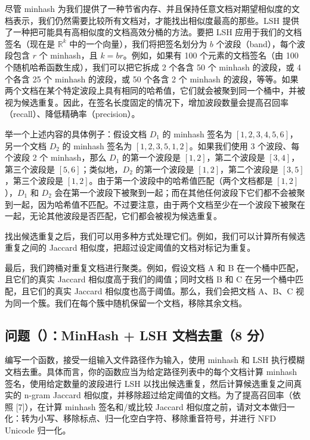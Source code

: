 尽管 minhash 为我们提供了一种节省内存、并且保持任意文档对期望相似度的文档表示，我们仍然需要比较所有文档对，才能找出相似度最高的那些。LSH 提供了一种把可能具有高相似度的文档高效分桶的方法。要把 LSH 应用于我们的文档签名（现在是 $\mathbb{R}^k$ 中的一个向量），我们将把签名划分为 $b$ 个波段（band），每个波段包含 $r$ 个 minhash，且 $k = br$。例如，如果有 100 个元素的文档签名（由 100 个随机哈希函数生成），我们可以把它拆成 2 个各含 50 个 minhash 的波段，或 4 个各含 25 个 minhash 的波段，或 50 个各含 2 个 minhash 的波段，等等。如果两个文档在某个特定波段上具有相同的哈希值，它们就会被聚到同一个桶中，并被视为候选重复。因此，在签名长度固定的情况下，增加波段数量会提高召回率（recall）、降低精确率（precision）。

举一个上述内容的具体例子：假设文档 $D_1$ 的 minhash 签名为 $[1, 2, 3, 4, 5, 6]$，另一个文档 $D_2$ 的 minhash 签名为 $[1, 2, 3, 5, 1, 2]$。如果我们使用 3 个波段、每个波段 2 个 minhash，那么 $D_1$ 的第一个波段是 $[1, 2]$，第二个波段是 $[3, 4]$，第三个波段是 $[5, 6]$；类似地，$D_2$ 的第一个波段是 $[1, 2]$，第二个波段是 $[3, 5]$，第三个波段是 $[1, 2]$。由于第一个波段中的哈希值匹配（两个文档都是 $[1, 2]$），$D_1$ 和 $D_2$ 会在第一个波段下被聚到一起；而在其他任何波段下它们都不会被聚到一起，因为哈希值不匹配。不过要注意，由于两个文档至少在一个波段下被聚在一起，无论其他波段是否匹配，它们都会被视为候选重复。

找出候选重复之后，我们可以用多种方式处理它们。例如，我们可以计算所有候选重复之间的 Jaccard 相似度，把超过设定阈值的文档对标记为重复。

最后，我们跨桶对重复文档进行聚类。例如，假设文档 A 和 B 在一个桶中匹配，且它们的真实 Jaccard 相似度高于我们的阈值；同时文档 B 和 C 在另一个桶中匹配，且它们的真实 Jaccard 相似度也高于阈值。那么，我们会把文档 A、B、C 视为同一个簇。我们在每个簇中随机保留一个文档，移除其余文档。

\subsection*{问题（）：MinHash + LSH 文档去重（8 分）}

编写一个函数，接受一组输入文件路径作为输入，使用 minhash 和 LSH 执行模糊文档去重。具体而言，你的函数应当为给定路径列表中的每个文档计算 minhash 签名，使用给定数量的波段进行 LSH 以找出候选重复，然后计算候选重复之间真实的 n-gram Jaccard 相似度，并移除超过给定阈值的文档。为了提高召回率（依照 [7]），在计算 minhash 签名和/或比较 Jaccard 相似度之前，请对文本做归一化：转为小写、移除标点、归一化空白字符、移除重音符号，并进行 NFD Unicode 归一化。


